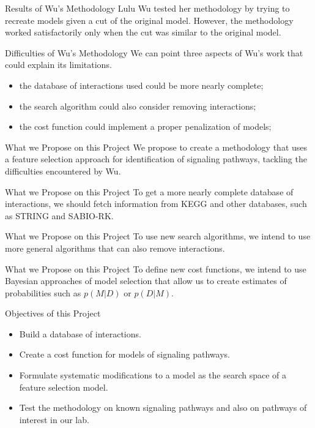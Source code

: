 \documentclass{beamer}
\begin{document}
\begin{frame}{Results of Wu's Methodology}
Lulu Wu tested her methodology by trying to recreate models given a cut
of the original model. \pause However, the methodology worked 
satisfactorily only when the cut was similar to the original model.
\end{frame}


\begin{frame}{Difficulties of Wu's Methodology}
We can point three aspects of Wu's work that could explain its 
limitations.
\begin{itemize}
\pause
\item{the database of interactions used could be more nearly complete;} 
\pause
\item{the search algorithm could also consider removing interactions;}
\pause
\item{the cost function could implement a proper penalization of 
models;}
\end{itemize}
\end{frame}


\begin{frame}{What we Propose on this Project}
We propose to create a methodology that uses a feature selection 
approach for identification of signaling pathways, tackling the 
difficulties encountered by Wu.
\end{frame}


\begin{frame}{What we Propose on this Project}
To get a more nearly complete database of interactions, we should fetch 
information from KEGG and other databases, \pause such as STRING and
SABIO-RK.
\end{frame}


\begin{frame}{What we Propose on this Project}
To use new search algorithms, \pause we intend to use more general
algorithms that can also remove interactions.
\end{frame}


\begin{frame}{What we Propose on this Project}
To define new cost functions, \pause we intend to use Bayesian 
approaches of model selection that allow us to create estimates of 
probabilities such as $p (M | D)$ or $p (D | M)$.
\end{frame}


\begin{frame}{Objectives of this Project}
\begin{itemize}
\pause
\item{Build a database of interactions.}
\pause
\item{Create a cost function for models of signaling pathways.}
\pause
\item{Formulate systematic modifications to a model as the search space
    of a feature selection model.}
\pause
\item{Test the methodology on known signaling pathways and also on 
    pathways of interest in our lab.}
\end{itemize}
\end{frame}
\end{document}

